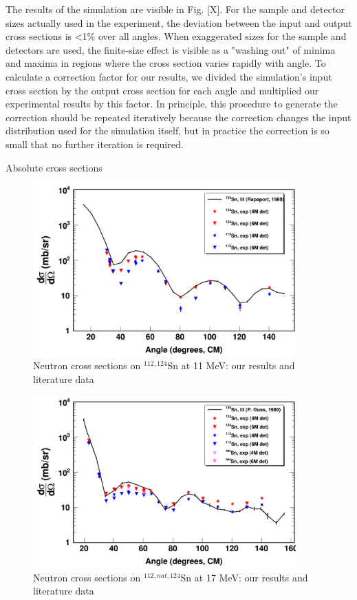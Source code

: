 The results of the simulation are visible in Fig. [X]. For the sample and
detector sizes actually used in the experiment, the deviation between the input
and output cross sections is <1\% over all angles. When exaggerated sizes for the
sample and detectors are used, the finite-size effect is visible as a "washing
out" of minima and maxima in regions where the cross section varies rapidly with
angle. To calculate a correction factor for our results, we divided the simulation's
input cross section by the output cross section for each angle and multiplied our
experimental results by this factor. In principle, this procedure to generate
the correction should be repeated iteratively because the correction changes the input distribution 
used for the simulation itself, but in practice the correction is so small
that no further iteration is required.

Absolute cross sections 

\begin{figure}
    \begin{center}
        \includegraphics[width = 0.9\textwidth]{figures/neutronECS_Sn_11MeV.png}
        \caption{Neutron \el cross sections on $^{112,124}$Sn at 11
    MeV: our results and literature data}
    \label{SnECS_11MeV}
\end{center}
\end{figure}

\begin{figure}
    \begin{center}
        \includegraphics[width = 0.9\textwidth]{figures/neutronECS_Sn_17MeV.png}
        \caption{Neutron \el cross sections on $^{112,nat,124}$Sn at 17
    MeV: our results and literature data} \label{SnECS_17MeV}
\end{center}
\end{figure}

\afterpage{\clearpage}
